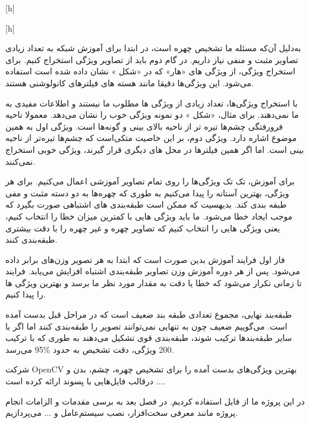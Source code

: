 [h]

[h]

به‌دلیل آن‌که مسئله ما تشخیص چهره است،‌ در ابتدا برای آموزش شبکه به تعداد زیادی تصاویر مثبت و منفی نیاز داریم. در گام دوم باید از تصاویر ویژگی استخراج کنیم.
برای استخراج ویژگی،‌ از ویژگی های «هار» که در «شکل » نشان داده شده است استفاده می‌شود. این ویژگی‌ها دقیقا مانند هسته های فیلترهای کانولوشنی هستند.


با استخراج ویژگی‌ها، ‌تعداد زیادی از ویژگی ها مطلوب ما نیستند و اطلاعات مفیدی به ما نمی‌دهند. برای مثال، «شکل » دو نمونه ویژگی خوب را نشان می‌دهد.
معمولا ناحیه فرورفتگی چشم‌ها تیره تر از ناحیه بالای بینی و گونه‌ها است. ویژگی اول به همین موضوع اشاره دارد. ویژگی دوم، ‌بر این خاصیت متکی‌است که چشم‌ها تیره‌تر از ناحیه بینی است.
اما اگر همین فیلتر‌ها در محل های دیگری قرار گیرند، ‌ویژگی خوبی استخراج نمی‌کنند.


برای آموزش،‌ تک تک ویژگی‌ها را روی تمام تصاویر آموزشی اعمال می‌کنیم. برای هر ویژگی، بهترین آستانه را پیدا می‌کنیم به طوری که چهره‌ها به دو دسته مثبت و مفی طبقه بندی کند. بدیهسیت که ممکن است طبقه‌بندی های اشتباهی صورت بگیرد که موجب ایجاد خطا می‌شود. ما باید ویژگی هایی با کمترین میزان خطا را انتخاب کنیم،‌ یعنی ویژگی هایی را انتخاب کنیم که تصاویر چهره و غیر چهره را با دقت بیشتری طبقه‌بندی کنند.

فاز اول فرایند آموزش بدین صورت است که ابتدا به هر تصویر وزن‌های برابر داده می‌شود. پس از هر دوره آموزش وزن تصاویر طبقه‌بندی اشتباه افزایش می‌یابد. فرایند تا زمانی تکرار می‌شود که خطا یا دقت به مقدار مورد نظر ما برسد و بهترین ویژگی ها را پیدا کنیم.


طبقه‌بند نهایی، مجموع تعدادی طبقه بند ضعیف است که در مراحل قبل بدست آمده است. می‌گوییم ضعیف چون به تنهایی نمی‌توانند تصویر را طبقه‌بندی کنند اما اگر با سایر طبقه‌بندها ترکیب شوند، طبقه‌بندی قوی تشکیل می‌دهند به طوری که با ترکیب 200 ویژگی، دقت تشخیص به حدود \%95 می‌رسد.


شرکت OpenCV بهترین ویژگی‌های بدست آمده را برای تشخیص چهره، چشم، بدن و ... درقالب فایل‌هایی با پسوند  ارائه کرده است.


در این پروژه ما از فایل  استفاده کردیم. در فصل بعد به برسی مقدمات و الزامات انجام پروژه مانند معرفی سخت‌افزار، نصب سیستم‌عامل و ... می‌پردازیم.

